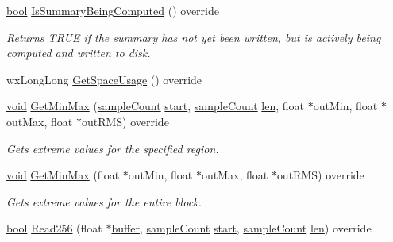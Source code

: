\begin{DoxyCompactItemize}
\hyperlink{mac_2config_2i386_2lib-src_2libsoxr_2soxr-config_8h_abb452686968e48b67397da5f97445f5b}{bool} \hyperlink{class_o_d_p_c_m_alias_block_file_aee1008f2f2d00561429b783d64bc5b82}{Is\+Summary\+Being\+Computed} () override
\begin{DoxyCompactList}\small\item\em Returns T\+R\+UE if the summary has not yet been written, but is actively being computed and written to disk. \end{DoxyCompactList}\item 
wx\+Long\+Long \hyperlink{class_o_d_p_c_m_alias_block_file_a6a84ebdbd41ecd17ef690f9067b66305}{Get\+Space\+Usage} () override
\item 
\hyperlink{sound_8c_ae35f5844602719cf66324f4de2a658b3}{void} \hyperlink{class_o_d_p_c_m_alias_block_file_afc0a91ff2adba499ab67c165386c9fed}{Get\+Min\+Max} (\hyperlink{include_2audacity_2_types_8h_afa427e1f521ea5ec12d054e8bd4d0f71}{sample\+Count} \hyperlink{seqread_8c_ac503262ae470564980711da4f78b1181}{start}, \hyperlink{include_2audacity_2_types_8h_afa427e1f521ea5ec12d054e8bd4d0f71}{sample\+Count} \hyperlink{lib_2expat_8h_af86d325fecfc8f47b61fbf5a5146f582}{len}, float $\ast$out\+Min, float $\ast$out\+Max, float $\ast$out\+R\+MS) override
\begin{DoxyCompactList}\small\item\em Gets extreme values for the specified region. \end{DoxyCompactList}\item 
\hyperlink{sound_8c_ae35f5844602719cf66324f4de2a658b3}{void} \hyperlink{class_o_d_p_c_m_alias_block_file_ade47540564fbe9ff526e33b49507275c}{Get\+Min\+Max} (float $\ast$out\+Min, float $\ast$out\+Max, float $\ast$out\+R\+MS) override
\begin{DoxyCompactList}\small\item\em Gets extreme values for the entire block. \end{DoxyCompactList}\item 
\hyperlink{mac_2config_2i386_2lib-src_2libsoxr_2soxr-config_8h_abb452686968e48b67397da5f97445f5b}{bool} \hyperlink{class_o_d_p_c_m_alias_block_file_add9c7cca332ca0b0be4a61c55881369a}{Read256} (float $\ast$\hyperlink{structbuffer}{buffer}, \hyperlink{include_2audacity_2_types_8h_afa427e1f521ea5ec12d054e8bd4d0f71}{sample\+Count} \hyperlink{seqread_8c_ac503262ae470564980711da4f78b1181}{start}, \hyperlink{include_2audacity_2_types_8h_afa427e1f521ea5ec12d054e8bd4d0f71}{sample\+Count} \hyperlink{lib_2expat_8h_af86d325fecfc8f47b61fbf5a5146f582}{len}) override

\end{DoxyCompactItemize}
